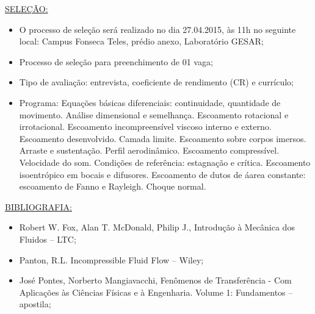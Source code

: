 \documentclass[a4paper,portuguese,12pt]{article}
\begin{document}
\underline{SELEÇÃO:}
\begin{itemize}
	\item O processo de seleção será realizado no dia 27.04.2015, às
	11h no seguinte local: Campus Fonseca Teles, prédio anexo, Laboratório
	GESAR;
	\item Processo de seleção para preenchimento de 01 vaga;
	\item Tipo de avaliação: entrevista, coeficiente de rendimento (CR)
	e currículo;
	\item Programa: Equações básicas diferenciais: continuidade,
	quantidade de movimento. Análise dimensional e semelhança.
	Escoamento rotacional e irrotacional. Escoamento incompreensível
	viscoso interno e externo. Escoamento desenvolvido. Camada limite.
	Escoamento sobre corpos imersos. Arraste e sustentação. Perfil
	aerodinâmico. Escoamento compressível. Velocidade do som. Condições
	de referência: estagnação e crítica. Escoamento isoentrópico em
	bocais e difusores. Escoamento de dutos de áarea constante:
	escoamento de Fanno e Rayleigh. Choque normal.
\end{itemize}

\underline{BIBLIOGRAFIA:}
\begin{itemize}
	\item Robert W. Fox, Alan T. McDonald, Philip J., Introdução à
	Mecânica dos Fluidos -- LTC;
	\item Panton, R.L. Incompressible Fluid Flow -- Wiley;
	\item José Pontes,  Norberto Mangiavacchi, Fenômenos de
	Transferência - Com Aplicações às Ciências Físicas e à Engenharia.
	Volume 1: Fundamentos -- apostila;
\end{itemize}
\end{document}
